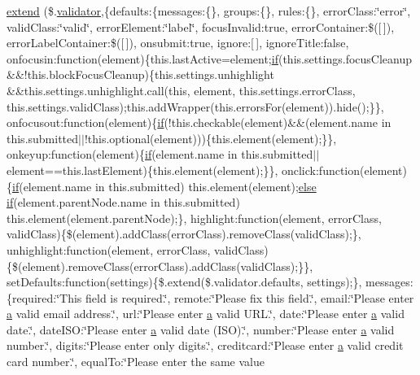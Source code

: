 \begin{DoxyCompactItemize}
\hyperlink{jquery_8validate-vsdoc_8js_a7f3cff8052d86204c557fc71867b777c}{extend} (\$.\hyperlink{_scripts_2jquery_8validate_8js_a2dc8272bb221cdffcccbd20db038f172}{validator},\{defaults\+:\{messages\+:\{\}, groups\+:\{\}, rules\+:\{\}, error\+Class\+:\char`\"{}error\char`\"{}, valid\+Class\+:\char`\"{}valid\char`\"{}, error\+Element\+:\char`\"{}label\char`\"{}, focus\+Invalid\+:true, error\+Container\+:\$(\mbox{[}$\,$\mbox{]}), error\+Label\+Container\+:\$(\mbox{[}$\,$\mbox{]}), onsubmit\+:true, ignore\+:\mbox{[}$\,$\mbox{]}, ignore\+Title\+:false, onfocusin\+:function(element)\{this.\+last\+Active=element;\hyperlink{_scripts_2respond_8min_8js_a93851d60dd037a83509a1757b9ee7b66}{if}(this.\+settings.\+focus\+Cleanup \&\&!this.\+block\+Focus\+Cleanup)\{this.\+settings.\+unhighlight \&\&this.\+settings.\+unhighlight.\+call(this, element, this.\+settings.\+error\+Class, this.\+settings.\+valid\+Class);this.\+add\+Wrapper(this.\+errors\+For(element)).hide();\}\}, onfocusout\+:function(element)\{\hyperlink{_scripts_2respond_8min_8js_a93851d60dd037a83509a1757b9ee7b66}{if}(!this.\+checkable(element)\&\&(element.\+name in this.\+submitted$\vert$$\vert$!this.\+optional(element)))\{this.\+element(element);\}\}, onkeyup\+:function(element)\{\hyperlink{_scripts_2respond_8min_8js_a93851d60dd037a83509a1757b9ee7b66}{if}(element.\+name in this.\+submitted$\vert$$\vert$element==this.\+last\+Element)\{this.\+element(element);\}\}, onclick\+:function(element)\{\hyperlink{_scripts_2respond_8min_8js_a93851d60dd037a83509a1757b9ee7b66}{if}(element.\+name in this.\+submitted) this.\+element(element);\hyperlink{_scripts_2jquery_8validate_8js_a0544c3fe466e421738dae463968b70ba}{else} \hyperlink{_scripts_2respond_8min_8js_a93851d60dd037a83509a1757b9ee7b66}{if}(element.\+parent\+Node.\+name in this.\+submitted) this.\+element(element.\+parent\+Node);\}, highlight\+:function(element, error\+Class, valid\+Class)\{\$(element).add\+Class(error\+Class).remove\+Class(valid\+Class);\}, unhighlight\+:function(element, error\+Class, valid\+Class)\{\$(element).remove\+Class(error\+Class).add\+Class(valid\+Class);\}\}, set\+Defaults\+:function(settings)\{\$.extend(\$.validator.\+defaults, settings);\}, messages\+:\{required\+:\char`\"{}This field is required.\char`\"{}, remote\+:\char`\"{}Please fix this field.\char`\"{}, email\+:\char`\"{}Please enter \hyperlink{jquery_8unobtrusive-ajax_8min_8js_a9cf3d65797f4cbe9deaab01492290370}{a} valid email address.\char`\"{}, url\+:\char`\"{}Please enter \hyperlink{jquery_8unobtrusive-ajax_8min_8js_a9cf3d65797f4cbe9deaab01492290370}{a} valid U\+R\+L.\char`\"{}, date\+:\char`\"{}Please enter \hyperlink{jquery_8unobtrusive-ajax_8min_8js_a9cf3d65797f4cbe9deaab01492290370}{a} valid date.\char`\"{}, date\+I\+S\+O\+:\char`\"{}Please enter \hyperlink{jquery_8unobtrusive-ajax_8min_8js_a9cf3d65797f4cbe9deaab01492290370}{a} valid date (I\+S\+O).\char`\"{}, number\+:\char`\"{}Please enter \hyperlink{jquery_8unobtrusive-ajax_8min_8js_a9cf3d65797f4cbe9deaab01492290370}{a} valid number.\char`\"{}, digits\+:\char`\"{}Please enter only digits.\char`\"{}, creditcard\+:\char`\"{}Please enter \hyperlink{jquery_8unobtrusive-ajax_8min_8js_a9cf3d65797f4cbe9deaab01492290370}{a} valid credit card number.\char`\"{}, equal\+To\+:\char`\"{}Please enter the same value 
\end{DoxyCompactItemize}
